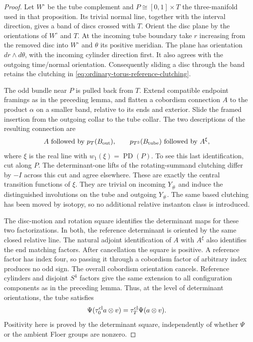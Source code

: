 \documentclass[11pt]{amsart}
\theoremstyle{definition}
\theoremstyle{remark}
\theoremstyle{plain}
\begin{document}
\begin{proof}
Let $W^\circ$ be the tube complement and
$P\cong[0,1]\times T$ the three-manifold used
in that proposition. Its trivial normal line,
together with the interval direction, gives
a band of discs crossed with $T$.
Orient the disc plane by the orientations
of $W^\circ$ and $T$. At the incoming
tube boundary take $r$ increasing from the
removed disc into $W^\circ$ and $\theta$
its positive meridian. The plane has
orientation $dr\wedge d\theta$, with the
incoming cylinder direction first.
It also agrees with
the outgoing time/normal orientation.
Consequently sliding a disc through the
band retains the clutching in
\eqref{eq:ordinary-torus-reference-clutching}.

The odd bundle near $P$ is pulled back
from $T$. Extend compatible endpoint
framings as in the preceding lemma,
and flatten a cobordism connection $A$
to the product $\alpha$ on a smaller
band, relative to its ends and exterior.
Slide the framed insertion from the
outgoing collar to the tube collar.
The two descriptions of the resulting
connection are
\[
 A\text{ followed by }p_T(B_{\rm out}),
 \qquad
 p_{T^3}(B_{\rm tube})\text{ followed by }A^\xi,
\]
where $\xi$ is the real line with
$w_1(\xi)=\operatorname{PD}(P)$.
To see this last identification, cut
along $P$. The determinant-one lifts
of the rotating-summand clutching
differ by $-I$ across this cut and
agree elsewhere. These are exactly
the central transition functions of
$\xi$. They are trivial on incoming
$Y_\#$ and induce the distinguished
involutions on the tube and outgoing
$Y_\#$. The same based clutching has
been moved by isotopy, so no additional
relative instanton class is introduced.

The disc-motion and rotation square
identifies the determinant maps for
these two factorizations. In both,
the reference determinant is oriented
by the same closed relative line.
The natural adjoint identification
of $A$ with $A^\xi$ also identifies
the end matching factors.
After cancellation the square is
positive. A reference factor has
index four, so passing it through
a cobordism factor of arbitrary
index produces no odd sign.
The overall cobordism orientation
cancels. Reference cylinders and
disjoint $S^4$ factors give the
same extension to all configuration
components as in the preceding lemma.
Thus, at the level of determinant
orientations, the tube satisfies
\begin{equation}\label{eq:closed-torus-tube-square}
 \Psi(\tau_0^{\rm cl}a\otimes v)
                       =\tau_T^{\rm cl}\Psi(a\otimes v).
\end{equation}
Positivity here is proved by the
determinant square, independently
of whether $\Psi$ or the ambient
Floer groups are nonzero.


\end{proof}
\end{document}
